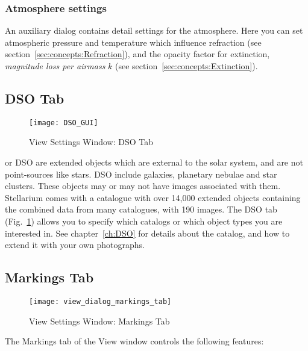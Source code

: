 \subsubsection{Atmosphere settings}
\label{sec:gui:view:sky:atmosphere}

An auxiliary dialog contains detail settings for the atmosphere. Here
you can set atmospheric pressure and temperature which influence
refraction (see section~\ref{sec:concepts:Refraction}), and the
opacity factor for extinction, \emph{magnitude loss per airmass} $k$
(see section~\ref{sec:concepts:Extinction}).


\subsection{DSO Tab}
\label{sec:gui:view:dso}

\begin{figure}[t]
\texttt{[image: DSO\_GUI]}
\caption{View Settings Window: DSO Tab}
\label{fig:gui:view:dso}
\end{figure}


 or DSO are extended objects which are
external to the solar system, and are not point-sources like stars.
DSO include galaxies, planetary nebulae and star clusters. These
objects may or may not have images associated with them. Stellarium
comes with a catalogue with over 14,000 extended objects containing
the combined data from many catalogues, with 190 images.  The DSO tab
(Fig.~\ref{fig:gui:view:dso}) allows you to specify which catalogs or
which object types you are interested in. See chapter~\ref{ch:DSO} for
details about the catalog, and how to extend it with your own photographs.





\subsection{Markings Tab}
\label{sec:gui:view:markings}

\begin{figure}[t]
\centering\texttt{[image: view\_dialog\_markings\_tab]}
\caption{View Settings Window: Markings Tab}
\label{fig:gui:view:markings}
\end{figure}

The Markings tab of the View window controls the following features:

